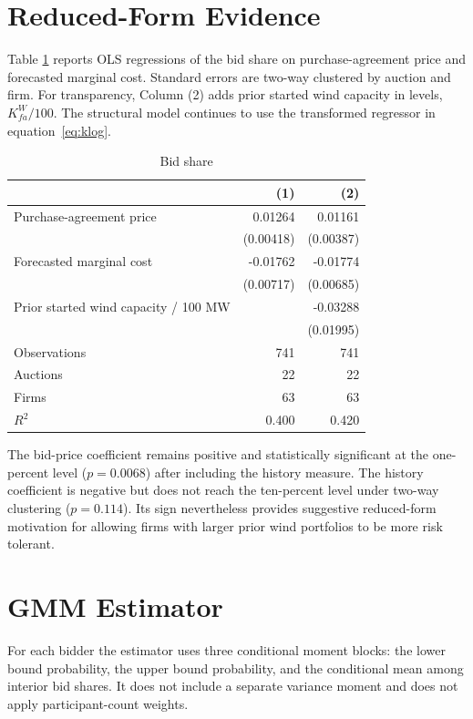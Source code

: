 \documentclass[10pt]{article}
\begin{document}
\section{Reduced-Form Evidence}

Table \ref{tab:reduced_form} reports OLS regressions of the bid share on
purchase-agreement price and forecasted marginal cost. Standard errors are
two-way clustered by auction and firm. For transparency, Column (2) adds prior
started wind capacity in levels, $K^W_{fa}/100$. The structural model continues
to use the transformed regressor in equation~\eqref{eq:klog}.

\begin{table}[H]
\centering
\caption{Bid share}
\label{tab:reduced_form}
\begin{tabular}{lrr}
\toprule
& (1) & (2)\\
\midrule
Purchase-agreement price
& 0.01264 & 0.01161\\
& (0.00418) & (0.00387)\\
Forecasted marginal cost
& -0.01762 & -0.01774\\
& (0.00717) & (0.00685)\\
Prior started wind capacity / 100 MW
& & -0.03288\\
& & (0.01995)\\
\midrule
Observations & 741 & 741\\
Auctions & 22 & 22\\
Firms & 63 & 63\\
$R^2$ & 0.400 & 0.420\\
\bottomrule
\end{tabular}
\end{table}

The bid-price coefficient remains positive and statistically significant at
the one-percent level ($p=0.0068$) after including the history measure. The
history coefficient is negative but does not reach the ten-percent level under
two-way clustering ($p=0.114$). Its sign nevertheless
provides suggestive reduced-form motivation for allowing firms with larger
prior wind portfolios to be more risk tolerant.

\section{GMM Estimator}

For each bidder the estimator uses three conditional moment blocks: the lower
bound probability, the upper bound probability, and the conditional mean among
interior bid shares. It does not include a separate variance moment and does
not apply participant-count weights.
\end{document}
